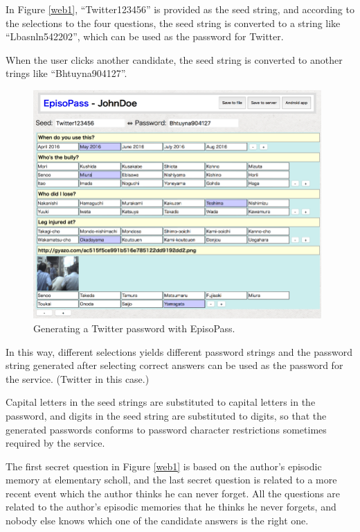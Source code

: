 \documentclass{article}
\begin{document}
In Figure \ref{web1},
``\textsf{Twitter123456}'' is provided as the seed string,
and according to the selections to the four questions,
the seed string is converted to a string like
``\textsf{Lbasnln542202}'',
which can be used as the password for Twitter.

When the user clicks another candidate,
the seed string is converted to another trings like
``\textsf{Bhtuyna904127}''.

\begin{figure}[H]
\includegraphics[width=110mm,bb=-30 0 803 660]{figures/01e5507d090eb494a20bcbc47c86b1d2.png}
\caption{Generating a Twitter password with EpisoPass.}
\label{web11}
\end{figure}

In this way, different selections yields different password strings and
the password string generated after selecting correct answers can be
used as the password for the service. (Twitter in this case.)

Capital letters in the seed strings are substituted to capital letters in the password,
and digits in the seed string are substituted to digits,
so that the generated passwords conforms to password character restrictions
sometimes required by the service.


The first secret question in Figure \ref{web1}
is based on the author's episodic memory at elementary scholl,
and the last secret question is related to a more recent event
which the author thinks he can never forget.
All the questions are related to the author's episodic memories
that he thinks he never forgets, and nobody else knows which one of the
candidate answers is the right one.
\end{document}
